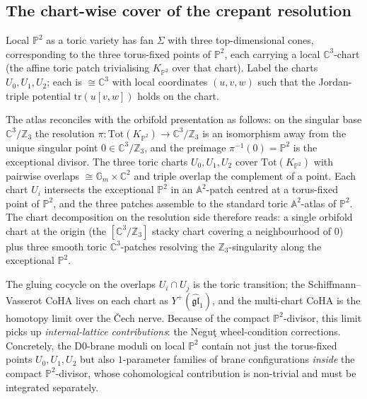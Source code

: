 \subsection{The chart-wise cover of the crepant resolution}
\label{subsec:chartwise-crepant}

Local $\mathbb{P}^2$ as a toric variety has fan $\Sigma$ with three top-dimensional cones, corresponding to the three torus-fixed points of $\mathbb{P}^2$, each carrying a local $\mathbb{C}^3$-chart (the affine toric patch trivialising $K_{\mathbb{P}^2}$ over that chart). Label the charts $U_0, U_1, U_2$; each is $\cong \mathbb{C}^3$ with local coordinates $(u, v, w)$ such that the Jordan-triple potential $\mathrm{tr}(u[v,w])$ holds on the chart.

The atlas reconciles with the orbifold presentation as follows: on the singular base $\mathbb{C}^3/\mathbb{Z}_3$ the resolution $\pi : \mathrm{Tot}(K_{\mathbb{P}^2}) \to \mathbb{C}^3/\mathbb{Z}_3$ is an isomorphism away from the unique singular point $0 \in \mathbb{C}^3/\mathbb{Z}_3$, and the preimage $\pi^{-1}(0) = \mathbb{P}^2$ is the exceptional divisor. The three toric charts $U_0, U_1, U_2$ cover $\mathrm{Tot}(K_{\mathbb{P}^2})$ with pairwise overlaps $\cong \mathbb{G}_m \times \mathbb{C}^2$ and triple overlap the complement of a point. Each chart $U_i$ intersects the exceptional $\mathbb{P}^2$ in an $\mathbb{A}^2$-patch centred at a torus-fixed point of $\mathbb{P}^2$, and the three patches assemble to the standard toric $\mathbb{A}^2$-atlas of $\mathbb{P}^2$. The chart decomposition on the resolution side therefore reads: a single orbifold chart at the origin (the $[\mathbb{C}^3/\mathbb{Z}_3]$ stacky chart covering a neighbourhood of $0$) plus three smooth toric $\mathbb{C}^3$-patches resolving the $\mathbb{Z}_3$-singularity along the exceptional $\mathbb{P}^2$.

The gluing cocycle on the overlaps $U_i \cap U_j$ is the toric transition; the Schiffmann--Vasserot CoHA lives on each chart as $Y^+(\widehat{\mathfrak{gl}}_1)$, and the multi-chart CoHA is the homotopy limit over the \v{C}ech nerve. Because of the compact $\mathbb{P}^2$-divisor, this limit picks up \emph{internal-lattice contributions}: the Negu\c{t} wheel-condition corrections. Concretely, the D0-brane moduli on local $\mathbb{P}^2$ contain not just the torus-fixed points $U_0, U_1, U_2$ but also $1$-parameter families of brane configurations \emph{inside} the compact $\mathbb{P}^2$-divisor, whose cohomological contribution is non-trivial and must be integrated separately.

